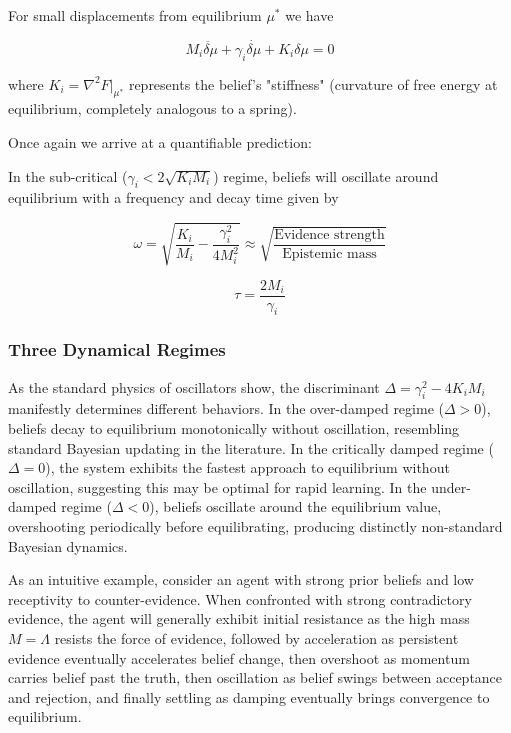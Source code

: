 \documentclass[12pt]{article}
\begin{document}
For small displacements from equilibrium $\mu^*$ we have

\begin{equation}
M_i\ddot{\delta\mu} + \gamma_i\dot{\delta\mu} + K_i\delta\mu = 0
\end{equation}

where $K_i = \nabla^2 F|_{\mu^*}$ represents the belief's "stiffness" (curvature of free energy at equilibrium, completely analogous to a spring).

Once again we arrive at a quantifiable prediction:

In the sub-critical ($\gamma_i < 2\sqrt{K_i M_i}$) regime, beliefs will oscillate around equilibrium with a frequency and decay time given by

\begin{equation}
\boxed{\omega = \sqrt{\frac{K_i}{M_i} - \frac{\gamma_i^2}{4M_i^2}} \approx \sqrt{\frac{\text{Evidence strength}}{\text{Epistemic mass}}}}
\end{equation}

\begin{equation}
\tau = \frac{2M_i}{\gamma_i}
\end{equation}


\subsubsection{Three Dynamical Regimes}

As the standard physics of oscillators show, the discriminant $\Delta = \gamma_i^2 - 4K_iM_i$ manifestly determines different behaviors. In the over-damped regime ($\Delta > 0$), beliefs decay to equilibrium monotonically without oscillation, resembling standard Bayesian updating in the literature. In the critically damped regime ($\Delta = 0$), the system exhibits the fastest approach to equilibrium without oscillation, suggesting this may be optimal for rapid learning. In the under-damped regime ($\Delta < 0$), beliefs oscillate around the equilibrium value, overshooting periodically before equilibrating, producing distinctly non-standard Bayesian dynamics.

As an intuitive example, consider an agent with strong prior beliefs and low receptivity to counter-evidence. When confronted with strong contradictory evidence, the agent will generally exhibit initial resistance as the high mass $M = \Lambda$ resists the force of evidence, followed by acceleration as persistent evidence eventually accelerates belief change, then overshoot as momentum carries belief past the truth, then oscillation as belief swings between acceptance and rejection, and finally settling as damping eventually brings convergence to equilibrium.
\end{document}
